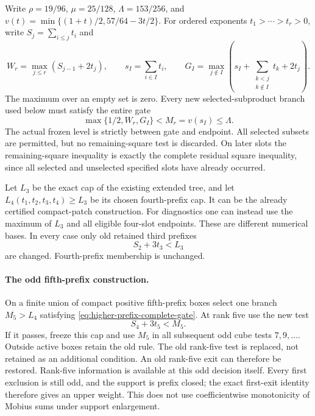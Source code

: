 \documentclass[11pt]{article}
\begin{document}
Write $\rho=19/96$, $\mu=25/128$, $\Lambda=153/256$, and
$v(t)=\min\{(1+t)/2,57/64-3t/2\}$. For ordered exponents
$t_1>\cdots>t_r>0$, write $S_j=\sum_{i\le j}t_i$ and
\[
 W_r=\max_{j\le r}(S_{j-1}+2t_j),\qquad
 s_I=\sum_{i\in I}t_i,\qquad
 G_I=\max_{j\notin I}
 \left(s_I+\sum_{\substack{k<j\\k\notin I}}t_k+2t_j\right).
\]
The maximum over an empty set is zero. Every new selected-subproduct
branch used below must satisfy the entire gate
\begin{equation}\label{eq:higher-prefix-complete-gate}
 \max\{1/2,W_r,G_I\}<M_r=v(s_I)\le\Lambda.
\end{equation}
The actual frozen level is strictly between gate and endpoint.
All selected subsets are permitted, but no remaining-square test
is discarded. On later slots the remaining-square inequality is
exactly the complete residual square inequality, since all selected
and unselected specified slots have already occurred.

Let $L_3$ be the exact cap of the existing extended tree, and let
$L_4(t_1,t_2,t_3,t_4)\ge L_3$ be its chosen fourth-prefix cap.
It can be the already certified compact-patch construction.
For diagnostics one can instead use the maximum of $L_3$ and all
eligible four-slot endpoints. These are different numerical bases.
In every case only old retained third prefixes
\begin{equation}\label{eq:higher-prefix-old-third}
 S_2+3t_3<L_3
\end{equation}
are changed. Fourth-prefix membership is unchanged.

\paragraph{The odd fifth-prefix construction.}
On a finite union of compact positive fifth-prefix boxes select
one branch $M_5>L_4$ satisfying
\eqref{eq:higher-prefix-complete-gate}. At rank five use the new
test
\[
 S_4+3t_5<M_5.
\]
If it passes, freeze this cap and use $M_5$ in all subsequent odd
cube tests $7,9,\ldots$. Outside active boxes retain the old rule.
The old rank-five test is replaced, not retained as an additional
condition. An old rank-five exit can therefore be restored.
Rank-five information is available at this odd decision itself.
Every first exclusion is still odd, and the support is prefix
closed; the exact first-exit identity therefore gives an upper
weight. This does not use coefficientwise monotonicity of Mobius
sums under support enlargement.
\end{document}
